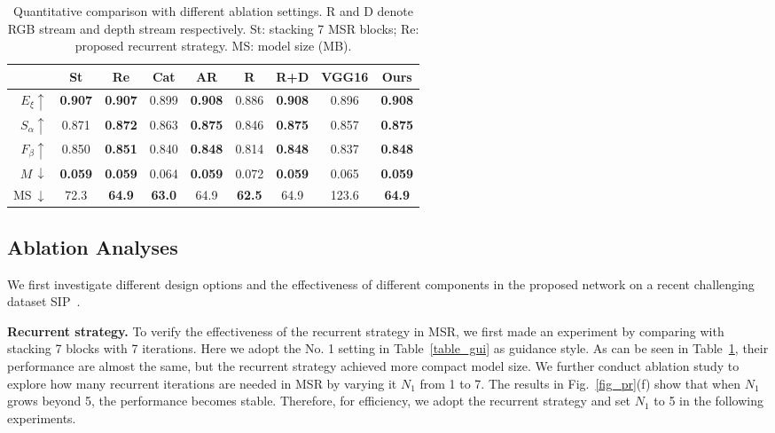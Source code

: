 \documentclass[runningheads]{llncs}
\begin{document}
\setlength{\tabcolsep}{6pt}
\begin{table}[]
\begin{center}
\caption{Quantitative comparison with different ablation settings. R and D denote RGB stream and depth stream respectively. St: stacking 7 MSR blocks; Re: proposed recurrent strategy. MS: model size (MB).}
\label{table_ablation}
\begin{tabular}{r|cc|cc|cc|cc}
\hline
\hline
          & St    & Re    & Cat   & AR    & R     & R+D   & VGG16 & Ours  \\ \hline
$E_{\xi}\uparrow$ & \textbf{0.907} & \textbf{0.907} & 0.899 & \textbf{0.908} & 0.886 & \textbf{0.908} & 0.896 & \textbf{0.908} \\
$S_{\alpha}\uparrow$ & 0.871 & \textbf{0.872} & 0.863 & \textbf{0.875} & 0.846 & \textbf{0.875} & 0.857 & \textbf{0.875} \\
$F_{\beta}\uparrow$ & 0.850 & \textbf{0.851} & 0.840 & \textbf{0.848} & 0.814 & \textbf{0.848} & 0.837 & \textbf{0.848} \\
$M\,\downarrow$  & \textbf{0.059} & \textbf{0.059} & 0.064 & \textbf{0.059} & 0.072 & \textbf{0.059} & 0.065 & \textbf{0.059} \\
MS$~\downarrow$ & 72.3  & \textbf{64.9}  & \textbf{63.0}  & 64.9  & \textbf{62.5} & 64.9  & 123.6 & \textbf{64.9}  \\ \hline
\hline
\end{tabular}
\end{center}
\end{table}
\setlength{\tabcolsep}{1.6pt}


\subsection{Ablation Analyses}\label{sec4.2}
We first investigate different design options and the effectiveness of different components in the proposed network on a recent challenging dataset SIP~\cite{fan2019rethinking}.

\textbf{Recurrent strategy.} To verify the effectiveness of the recurrent strategy in MSR, we first made an experiment by comparing with stacking 7 blocks with 7 iterations. Here we adopt the No. 1 setting in Table~\ref{table_gui} as guidance style. As can be seen in Table~\ref{table_ablation}, their performance are almost the same, but the recurrent strategy achieved more compact model size. We further conduct ablation study to explore how many recurrent iterations are needed in MSR by varying it $N_{1}$ from 1 to 7. The results in Fig.~\ref{fig_pr}(f) show that when $N_{1}$ grows beyond 5, the performance becomes stable. Therefore, for efficiency, we adopt the recurrent strategy and set $N_{1}$ to 5 in the following experiments.
\end{document}
